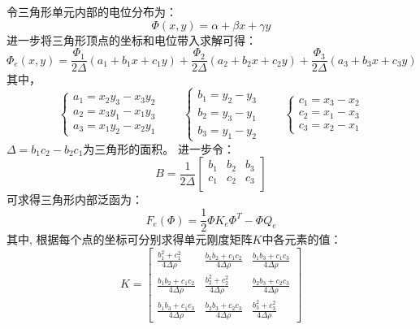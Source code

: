 令三角形单元内部的电位分布为：
\begin{equation}
  \Phi(x,y) = \alpha + \beta x + \gamma y 
\end{equation}
进一步将三角形顶点的坐标和电位带入求解可得：
\begin{equation}
  \Phi_e(x,y) = \frac{\Phi_1}{2\Delta}(a_1+b_1x+c_1y) + \frac{\Phi_2}{2\Delta}(a_2+b_2x+c_2y) + \frac{\Phi_3}{2\Delta}(a_3+b_3x+c_3y)
\end{equation}
其中，
\begin{equation}
  \left\{
  \begin{array}{c}
    a_1 = x_2y_3 - x_3y_2 \\
    a_2 = x_3y_1 - x_1y_3 \\
    a_3 = x_1y_2 - x_2y_1
  \end{array}
  \right.
  \qquad 
  \left\{
    \begin{array}{c}
      b_1 = y_2 - y_3 \\
      b_2 = y_3 - y_1 \\
      b_3 = y_1 - y_2
    \end{array}
    \right.
    \qquad 
    \left\{
      \begin{array}{c}
        c_1 = x_3 - x_2 \\
        c_2 = x_1 - x_3 \\
        c_3 = x_2 - x_1
      \end{array}
      \right.
\end{equation}
$\Delta = b_1c_2 - b_2c_1$为三角形的面积。
进一步令：
\begin{equation}
  B = \frac{1}{2\Delta} \left[
  \begin{array}{ccc}
    b_1 & b_2 & b_3 \\
    c_1 & c_2 & c_3 \\
    
  \end{array}
  \right]
\end{equation}
可求得三角形内部泛函为：
\begin{equation}
  F_e(\Phi) = \frac{1}{2} \Phi K_e \Phi^T - \Phi Q_e
\end{equation}
其中,
根据每个点的坐标可分别求得单元刚度矩阵$K$中各元素的值：
\begin{equation}
  K = 
  \left[
  \begin{array}{ccc}
    \frac{b_1^2 + c_1^2}{4\Delta \rho} & \frac{b_1b_2 + c_1c_2}{4\Delta \rho} & \frac{b_1b_3 + c_1c_3}{4\Delta \rho}  \\
    \frac{b_1b_2 + c_1c_2}{4\Delta \rho} & \frac{b_2^2 + c_2^2}{4\Delta \rho} & \frac{b_2b_3 + c_2c_3}{4\Delta \rho} \\
    \frac{b_1b_3 + c_1c_3}{4\Delta \rho} &  \frac{b_2b_3 + c_2c_3}{4\Delta \rho}& \frac{b_3^2 + c_3^2}{4\Delta \rho} 
  \end{array}
  \right]
\end{equation}
